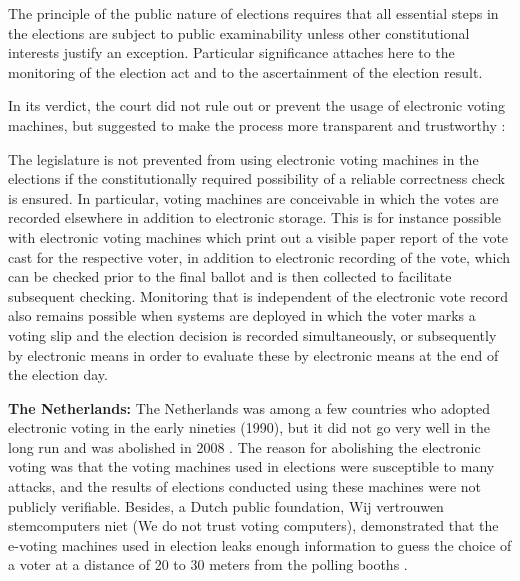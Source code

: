   \begin{displayquote}
  The principle of the public nature of elections requires that all 
  essential steps in the elections are subject to public examinability
  unless other constitutional interests justify an exception. 
  Particular significance attaches here to the monitoring of the 
  election act and to the ascertainment of the election result.
  \end{displayquote}
  
 
 
  \noindent	
  In its verdict, the court did not rule out or prevent the usage of electronic 
  voting machines,  but suggested to make the process more 
  transparent and trustworthy \citep{Germanconst}:
  
  \begin{displayquote}
  The legislature is not prevented from using electronic voting machines 
  in the elections if the constitutionally required possibility of a 
  reliable correctness check is ensured. In particular, voting machines 
  are conceivable in which the votes are recorded elsewhere in addition
   to electronic storage. This is for instance possible with electronic
   voting machines which print out a visible paper report of the vote 
   cast for the respective voter, in addition to electronic recording 
   of the vote, which can be checked prior to the final ballot and is
    then collected to facilitate subsequent checking. Monitoring that is
     independent of the electronic vote record also remains possible when
     systems are deployed in which the voter marks a voting slip and the 
     election decision is recorded simultaneously, 
     or subsequently by electronic means in 
     order to evaluate these by electronic means at the end of the 
     election day.
     \end{displayquote}
  
  \textbf{The Netherlands:}
  The Netherlands was among a few countries who adopted electronic voting 
  in the early nineties (1990), but it did not go very well in the long 
  run and was abolished in 2008 \citep{Jacobs2009}. 
  The reason for abolishing the electronic voting was that   
  the voting machines used in elections were susceptible to many attacks,
  and the results of elections conducted using these machines 
  were not publicly verifiable.  Besides, a Dutch public foundation, Wij vertrouwen stemcomputers niet
  (We do not trust voting computers), demonstrated that the e-voting machines 
  used in election leaks enough information to guess the choice of a voter 
  at a distance of 20 to 30 meters from 
  the polling booths  \citep{NetherlandsYouTube}.
  
